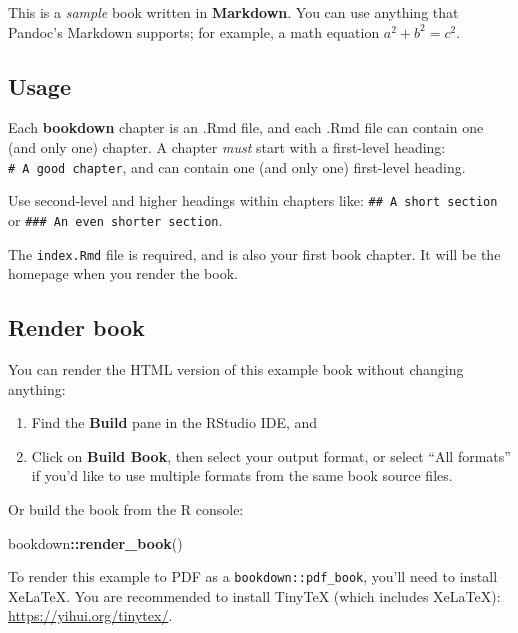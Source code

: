 \documentclass[
]{book}
\newenvironment{Shaded}{\begin{snugshade}}{\end{snugshade}}
\newcommand{\FunctionTok}[1]{\textcolor[rgb]{0.13,0.29,0.53}{\textbf{#1}}}
\newcommand{\NormalTok}[1]{#1}
\newcommand{\SpecialCharTok}[1]{\textcolor[rgb]{0.81,0.36,0.00}{\textbf{#1}}}
\theoremstyle{definition}
\theoremstyle{definition}
\theoremstyle{definition}
\theoremstyle{definition}
\theoremstyle{remark}
\begin{document}
This is a \emph{sample} book written in \textbf{Markdown}. You can use anything that Pandoc's Markdown supports; for example, a math equation \(a^2 + b^2 = c^2\).

\hypertarget{usage}{%
\subsection{Usage}\label{usage}}

Each \textbf{bookdown} chapter is an .Rmd file, and each .Rmd file can contain one (and only one) chapter. A chapter \emph{must} start with a first-level heading: \texttt{\#\ A\ good\ chapter}, and can contain one (and only one) first-level heading.

Use second-level and higher headings within chapters like: \texttt{\#\#\ A\ short\ section} or \texttt{\#\#\#\ An\ even\ shorter\ section}.

The \texttt{index.Rmd} file is required, and is also your first book chapter. It will be the homepage when you render the book.

\hypertarget{render-book}{%
\subsection{Render book}\label{render-book}}

You can render the HTML version of this example book without changing anything:

\begin{enumerate}
\def\labelenumi{\arabic{enumi}.}
\item
  Find the \textbf{Build} pane in the RStudio IDE, and
\item
  Click on \textbf{Build Book}, then select your output format, or select ``All formats'' if you'd like to use multiple formats from the same book source files.
\end{enumerate}

Or build the book from the R console:

\begin{Shaded}
\begin{Highlighting}[]
\NormalTok{bookdown}\SpecialCharTok{::}\FunctionTok{render\_book}\NormalTok{()}
\end{Highlighting}
\end{Shaded}

To render this example to PDF as a \texttt{bookdown::pdf\_book}, you'll need to install XeLaTeX. You are recommended to install TinyTeX (which includes XeLaTeX): \url{https://yihui.org/tinytex/}.
\end{document}
